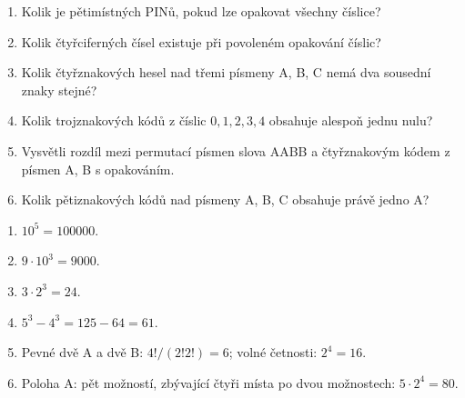 \documentclass[11pt,a4paper]{article}
\begin{document}
\begin{zadaniReseniBox}[title={Domácí úkol}]

\begin{enumerate}[label=\alph*),leftmargin=*,itemsep=2pt]

\item Kolik je pětimístných PINů, pokud lze opakovat všechny číslice?
\item Kolik čtyřciferných čísel existuje při povoleném opakování číslic?
\item Kolik čtyřznakových hesel nad třemi písmeny A, B, C nemá dva sousední znaky stejné?
\item Kolik trojznakových kódů z číslic $0,1,2,3,4$ obsahuje alespoň jednu nulu?
\item Vysvětli rozdíl mezi permutací písmen slova AABB a čtyřznakovým kódem z písmen A, B s opakováním.
\item Kolik pětiznakových kódů nad písmeny A, B, C obsahuje právě jedno A?

\end{enumerate}

\tcblower

\begin{enumerate}[label=\alph*),leftmargin=*,itemsep=2pt]

\item $10^5=100000$.
\item $9\cdot10^3=9000$.
\item $3\cdot2^3=24$.
\item $5^3-4^3=125-64=61$.
\item Pevné dvě A a dvě B: $4!/(2!2!)=6$; volné četnosti: $2^4=16$.
\item Poloha A: pět možností, zbývající čtyři místa po dvou možnostech: $5\cdot2^4=80$.

\end{enumerate}

\end{zadaniReseniBox}


\end{document}
